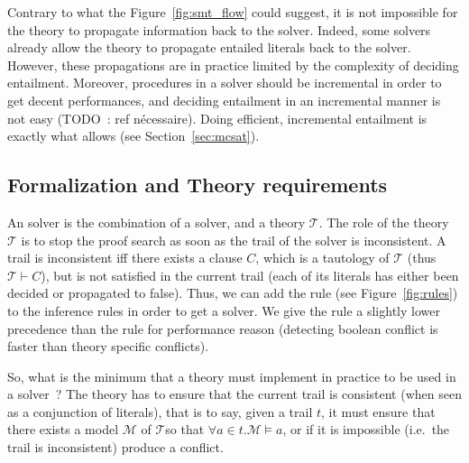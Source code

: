 \documentclass{article}
\begin{document}
Contrary to what the Figure~\ref{fig:smt_flow} could suggest, it is not impossible
for the theory to propagate information back to the \sat{} solver. Indeed,
some \smt{} solvers already allow the theory to propagate entailed literals back to the
\sat{} solver. However, these propagations are in practice limited by the complexity
of deciding entailment. Moreover, procedures in a \smt{} solver should be incremental
in order to get decent performances, and deciding entailment in an incremental manner
is not easy (TODO~: ref nécessaire). Doing efficient, incremental entailment is exactly
what \mcsat{} allows (see Section~\ref{sec:mcsat}).

\subsection{Formalization and Theory requirements}

An \smt{} solver is the combination of a \sat{} solver, and a theory $\mathcal{T}$.
The role of the theory $\mathcal{T}$ is to stop the proof search as soon as the trail
of the \sat{} solver is inconsistent. A trail is inconsistent iff there exists a clause
$C$, which is a tautology of $\mathcal{T}$ (thus $\mathcal{T} \vdash C$), but is not
satisfied in the current trail (each of its literals has either been decided or
propagated to false). Thus, we can add the  rule (see
Figure~\ref{fig:rules}) to the \cdcl{} inference rules in order to get a \smt{} solver.
We give the  rule a slightly lower precedence than the
 rule for performance reason (detecting boolean conflict is
faster than theory specific conflicts).

So, what is the minimum that a theory must implement in practice to be used in a
\smt{} solver~? The theory has to ensure that the current trail is consistent
(when seen as a conjunction of literals), that is to say, given a trail $t$,
it must ensure that there exists a model $\mathcal{M}$ of $\mathcal{T} $so that
$\forall a \in t. \mathcal{M} \vDash a$, or if it is impossible (i.e.~the trail
is inconsistent) produce a conflict.
\end{document}
